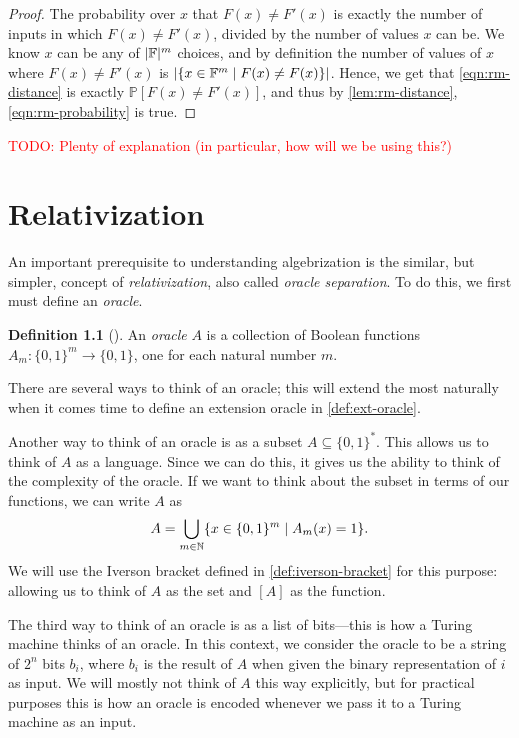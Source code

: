 \documentclass[english,12pt]{reedthesis}
\theoremstyle{plain}
\theoremstyle{definition}
\newtheorem{defn}[defn]{Definition}
\theoremstyle{remark}
\DeclarePairedDelimiter{\abs}{\lvert}{\rvert}
\newcommand{\TODO}[1]{\textcolor{red}{TODO: #1}}
\begin{document}
\begin{proof}
  The probability over $x$ that $F(x) \ne F'(x)$ is exactly the number of inputs
  in which $F(x) \ne F'(x)$, divided by the number of values $x$ can be. We know
  $x$ can be any of $\abs{\mathbb{F}}^{m}$ choices, and by definition the number
  of values of $x$ where $F(x) \ne F'(x)$ is
  $\abs{\{x \in \mathbb{F}^{m} \mid F(x) \ne F(x)\}}$. Hence, we get that
  \cref{eqn:rm-distance} is exactly $\mathbb{P}[F(x) \ne F'(x)]$, and thus by
  \cref{lem:rm-distance}, \cref{eqn:rm-probability} is true.
\end{proof}

\TODO{Plenty of explanation (in particular, how will we be using this?)}

\chapter{Relativization}

An important prerequisite to understanding algebrization is the similar, but
simpler, concept of \emph{relativization}, also called \emph{oracle separation}.
To do this, we first must define an \emph{oracle}.
\begin{defn}[{\cite[Def.\ 2.1]{AW09}}]\label{def:oracle}
  An \emph{oracle} $A$ is a collection of Boolean functions
  $A_{m}\colon \{0, 1\}^{m} \rightarrow \{0, 1\}$, one for each natural number $m$.
\end{defn}
There are several ways to think of an oracle; this will extend the most
naturally when it comes time to define an extension oracle in
\cref{def:ext-oracle}.

Another way to think of an oracle is as a subset $A \subseteq \{0, 1\}^{*}$. This allows
us to think of $A$ as a language. Since we can do this, it gives us the ability
to think of the complexity of the oracle. If we want to think about the subset
in terms of our functions, we can write $A$ as
\begin{equation}
  A = \bigcup_{m \in \mathbb{N}}\mleft\{x \in \{0, 1\}^{m} \mid A_{m}(x) = 1\mright\}.
\end{equation}
We will use the Iverson bracket defined in \cref{def:iverson-bracket} for this
purpose: allowing us to think of $A$ as the set and $[A]$ as the function.

The third way to think of an oracle is as a list of bits---this is how a Turing
machine thinks of an oracle. In this context, we consider the oracle to be a
string of $2^{n}$ bits $b_{i}$, where $b_{i}$ is the result of $A$ when given
the binary representation of $i$ as input. We will mostly not think of $A$ this
way explicitly, but for practical purposes this is how an oracle is encoded
whenever we pass it to a Turing machine as an input.
\end{document}
